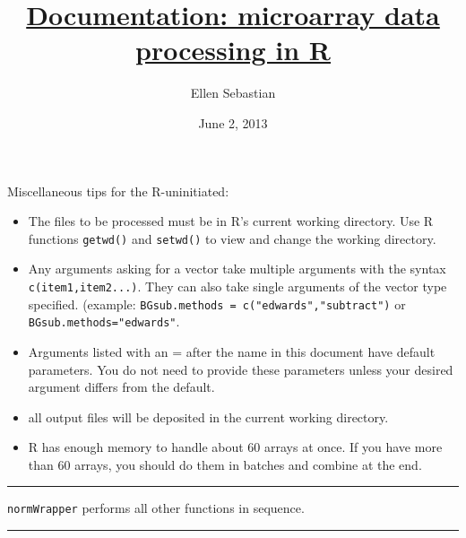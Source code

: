 \documentclass[10pt]{article}
\title{\bf{\underline{Documentation: microarray data processing in R}}}
\author{Ellen Sebastian} \date{June 2, 2013}
\begin{document}
\maketitle
Miscellaneous tips for the R-uninitiated: 
\begin{itemize}
\item The files to be processed must be in R's current working directory. Use R functions \texttt{getwd()} and \texttt{setwd()} to view and change the working directory.
\item Any arguments asking for a vector take multiple arguments with the syntax \texttt{c(item1,item2...)}. They can also take single arguments of the vector type specified. (example: \texttt{BGsub.methods = c("edwards","subtract")} or \texttt{BGsub.methods="edwards"}.
\item Arguments listed with an = after the name in this document have default parameters. You do not need to provide these parameters unless your desired argument differs from the default.
\item all output files will be deposited in the current working directory.
\item R has enough memory to handle about 60 arrays at once. If you have more than 60 arrays, you should do them in batches and combine at the end.
\end{itemize}
  \rule{\linewidth}{0.4pt}
  \texttt{normWrapper} \hspace{1in} performs all other functions in sequence.\\
    \rule{\linewidth}{0.4pt}
    
\end{document}
